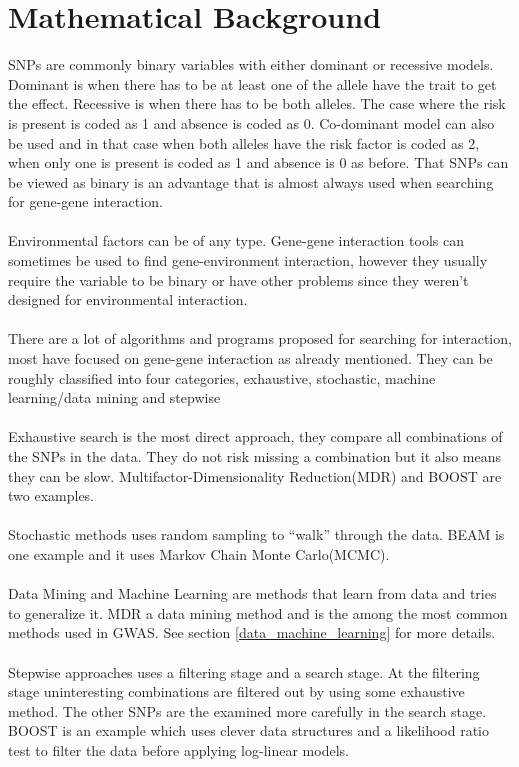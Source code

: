 \documentclass[10pt,a4paper]{report}
\begin{document}
\section{Mathematical Background}
SNPs are commonly binary variables with either dominant or recessive models. Dominant is when there has to be at least one of the allele have the trait to get the effect. Recessive is when there has to be both alleles. The case where the risk is present is coded as 1 and absence is coded as 0. Co-dominant model can also be used and in that case when both alleles have the risk factor is coded as 2, when only one is present is coded as 1 and absence is 0 as before. That SNPs can be viewed as binary is an advantage that is almost always used when searching for gene-gene interaction.\\
\\
Environmental factors can be of any type\cite{gene_enviroment_2013}. Gene-gene interaction tools can sometimes be used to find gene-environment interaction, however they usually require the variable to be binary or have other problems since they weren't designed for environmental interaction.\cite{gene_enviroment_2013}\\
\\
There are a lot of algorithms and programs proposed for searching for interaction, most have focused on gene-gene interaction as already mentioned. They can be roughly classified into four categories, exhaustive, stochastic, machine learning/data mining and stepwise\cite{fast_high_order_cluster}\\
\\
Exhaustive search is the most direct approach, they compare all combinations of the SNPs in the data. They do not risk missing a combination but it also means they can be slow. Multifactor-Dimensionality Reduction(MDR)\cite{mdr_2001} and BOOST\cite{boost_gene_gene} are two examples.\\
\\
Stochastic methods uses random sampling to ``walk'' through the data. BEAM\cite{beam_2007} is one example and it uses Markov Chain Monte Carlo(MCMC).\\
\\
Data Mining and Machine Learning are methods that learn from data and tries to generalize it. MDR\cite{mdr_2001} a data mining method and is the among the most common methods used in GWAS. See section \ref{data_machine_learning} for more details.\\
\\
Stepwise approaches uses a filtering stage and a search stage. At the filtering stage uninteresting combinations are filtered out by using some exhaustive method. The other SNPs are the examined more carefully in the search stage. BOOST\cite{boost_gene_gene} is an example which uses clever data structures and a likelihood ratio test to filter the data before applying log-linear models.
\end{document}
